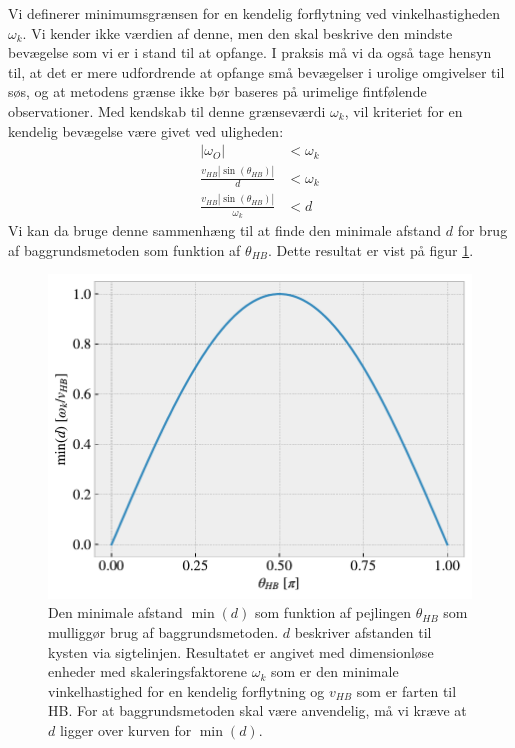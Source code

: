\documentclass[%
 reprint,
nofootinbib,
aps,
]{revtex4-1}
\begin{document}
Vi definerer minimumsgrænsen for en kendelig forflytning ved vinkelhastigheden $\omega_k$. Vi kender ikke værdien af denne, men den skal beskrive den mindste bevægelse som vi er i stand til at opfange. I praksis må vi da også tage hensyn til, at det er mere udfordrende at opfange små bevægelser i urolige omgivelser til søs, og at metodens grænse ikke bør baseres på urimelige fintfølende observationer. Med kendskab til denne grænseværdi $\omega_k$, vil kriteriet for en kendelig bevægelse være givet ved uligheden:
\begin{align}
 |\omega_O| &< \omega_k \nonumber \\
 \frac{v_{HB}|\sin{(\theta_{HB})}|}{d} &< \omega_k \nonumber \\
 \frac{v_{HB}|\sin{(\theta_{HB})}|}{\omega_k} &< d
 \label{eq:limit}
\end{align}
Vi kan da bruge denne sammenhæng til at finde den minimale afstand $d$ for brug af baggrundsmetoden som funktion af $\theta_{HB}$. Dette resultat er vist på figur \ref{fig:limit_dimensionless}.
 \begin{figure}[H]
   \includegraphics[width=\linewidth]{figures/limit_dimensionless.pdf}
   \caption{Den minimale afstand $\min{(d)}$ som funktion af pejlingen $\theta_{HB}$ som mulliggør brug af baggrundsmetoden. $d$ beskriver afstanden til kysten via sigtelinjen. Resultatet er angivet med dimensionløse enheder med skaleringsfaktorene $\omega_k$ som er den minimale vinkelhastighed for en kendelig forflytning og $v_{HB}$ som er farten til HB. For at baggrundsmetoden skal være anvendelig, må vi kræve at $d$ ligger over kurven for $\min{(d)}$.}
   \label{fig:limit_dimensionless}
 \end{figure}
\end{document}
